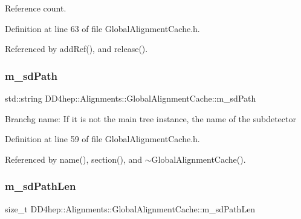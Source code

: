 Reference count. 



Definition at line 63 of file Global\+Alignment\+Cache.\+h.



Referenced by add\+Ref(), and release().

\hypertarget{class_d_d4hep_1_1_alignments_1_1_global_alignment_cache_a24050f584cfe000084802279065b8ee9}{}\label{class_d_d4hep_1_1_alignments_1_1_global_alignment_cache_a24050f584cfe000084802279065b8ee9} 
\subsubsection{\texorpdfstring{m\+\_\+sd\+Path}{m\_sdPath}}
{\footnotesize\ttfamily std\+::string D\+D4hep\+::\+Alignments\+::\+Global\+Alignment\+Cache\+::m\+\_\+sd\+Path\hspace{0.3cm}{\ttfamily [protected]}}

Branchg name\+: If it is not the main tree instance, the name of the subdetector 

Definition at line 59 of file Global\+Alignment\+Cache.\+h.



Referenced by name(), section(), and $\sim$\+Global\+Alignment\+Cache().

\hypertarget{class_d_d4hep_1_1_alignments_1_1_global_alignment_cache_a8adea69d0bd2c58caa97638937cafabf}{}\label{class_d_d4hep_1_1_alignments_1_1_global_alignment_cache_a8adea69d0bd2c58caa97638937cafabf} 
\subsubsection{\texorpdfstring{m\+\_\+sd\+Path\+Len}{m\_sdPathLen}}
{\footnotesize\ttfamily size\+\_\+t D\+D4hep\+::\+Alignments\+::\+Global\+Alignment\+Cache\+::m\+\_\+sd\+Path\+Len\hspace{0.3cm}{\ttfamily [protected]}}



